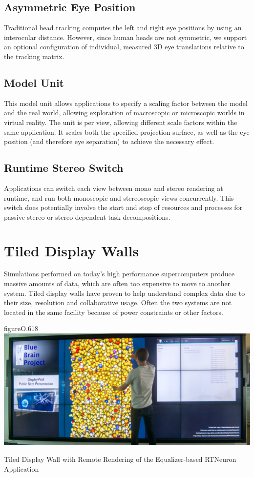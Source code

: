 \subsection{Asymmetric Eye Position}

Traditional head tracking computes the left and right eye positions by using an
interocular distance. However, since human heads are not symmetric, we support
an optional configuration of individual, measured 3D eye translations relative
to the tracking matrix.

\subsection{Model Unit}

This model unit allows applications to specify a scaling factor between the
model and the real world, allowing exploration of macroscopic or microscopic
worlds in virtual reality. The unit is per view, allowing different scale
factors within the same application. It scales both the specified projection
surface, as well as the eye position (and therefore eye separation) to achieve
the necessary effect.

\subsection{Runtime Stereo Switch}

Applications can switch each view between mono and stereo rendering at runtime,
and run both monoscopic and stereoscopic views concurrently. This switch does
potentially involve the start and stop of resources and processes for passive
stereo or stereo-dependent task decompositions.

\section{Tiled Display Walls}\label{sTIDE}

Simulations performed on today’s high performance supercomputers produce
massive amounts of data, which are often too expensive to move to another
system. Tiled display walls have proven to help understand complex data due
to their size, resolution and collaborative usage. Often the two systems are
not located in the same facility because of power constraints or other factors.

\begin{wrapfloat}{figure}{O}{.618\textwidth}
  \includegraphics[width=.618\textwidth]{images/tide}
  {\caption{\label{fTide}Tiled Display Wall with Remote Rendering of the Equalizer-based RTNeuron Application}}
\end{wrapfloat}

